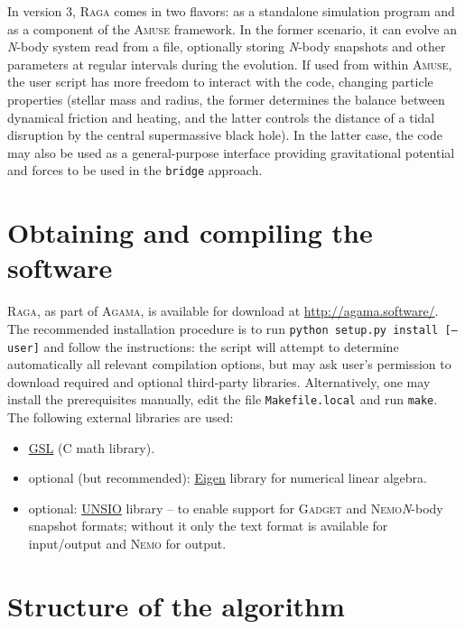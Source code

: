 \documentclass[12pt]{article}
\newcommand{\Nbody}{\textsl{N}-body\xspace}
\newcommand{\Raga}{\textsc{Raga}\xspace}
\newcommand{\Agama}{\textsc{Agama}\xspace}
\newcommand{\Amuse}{\textsc{Amuse}\xspace}
\newcommand{\Nemo}{\textsc{Nemo}\xspace}
\begin{document}
In version 3, \Raga comes in two flavors: as a standalone simulation program and as a component of the \Amuse framework. In the former scenario, it can evolve an \Nbody system read from a file, optionally storing \Nbody snapshots and other parameters at regular intervals during the evolution. If used from within \Amuse, the user script has more freedom to interact with the code, changing particle properties (stellar mass and radius, the former determines the balance between dynamical friction and heating, and the latter controls the distance of a tidal disruption by the central supermassive black hole). In the latter case, the code may also be used as a general-purpose interface providing gravitational potential and forces to be used in the \texttt{bridge} approach.


\section{Obtaining and compiling the software}

\Raga, as part of \Agama, is available for download at \url{http://agama.software/}. The recommended installation procedure is to run \texttt{python setup.py install [--user]} and follow the instructions: the script will attempt to determine automatically all relevant compilation options, but may ask user's permission to download required and optional third-party libraries. Alternatively, one may install the prerequisites manually, edit the file \texttt{Makefile.local} and run \texttt{make}. The following external libraries are used:
\begin{itemize}
\item \href{http://www.gnu.org/software/gsl/}{GSL} (C math library).
\item optional (but recommended): \href{http://eigen.tuxfamily.org/}{Eigen} library for numerical linear algebra.
\item optional: \href{http://projets.lam.fr/projects/unsio/}{UNSIO} library -- to enable support for \textsc{Gadget} and \Nemo \Nbody snapshot formats; without it only the text format is available for input/output and \Nemo for output.
\end{itemize}

\section{Structure of the algorithm}  \label{sec:algorithm}
\end{document}
